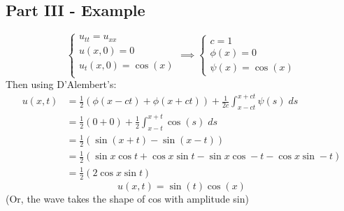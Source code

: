 \documentclass[12pt]{article}
\begin{document}
\subsection*{Part III  - Example}
\[\begin{cases}
    u_{tt} = u_{xx}\\
    u(x, 0) = 0\\
    u_t(x, 0) = \cos(x)\\
\end{cases} \implies \begin{cases}
    c = 1\\
    \phi(x) = 0\\
    \psi(x) = \cos (x)
\end{cases}\]
Then using D'Alembert's:
\begin{align*}
    u(x, t) &= \frac{1}{2}(\phi(x - ct) + \phi(x + ct)) + \frac{1}{2c}\int_{x - ct}^{x + ct} \psi(s)\;ds\\
    &= \frac{1}{2}(0 + 0) + \frac{1}{2} \int_{x - t}^{x +t}\cos(s)\; ds\\
    &= \frac{1}{2}(\sin(x + t) - \sin(x - t))\\
    &= \frac{1}{2}(\sin x \cos t + \cos x \sin t - \sin x \cos -t - \cos x \sin -t)\\
    &= \frac{1}{2}(2 \cos x \sin t)
\end{align*}
\[\boxed{u(x, t) = \sin(t) \cos(x)}\]
(Or, the wave takes the shape of cos with amplitude sin)

\
\end{document}
